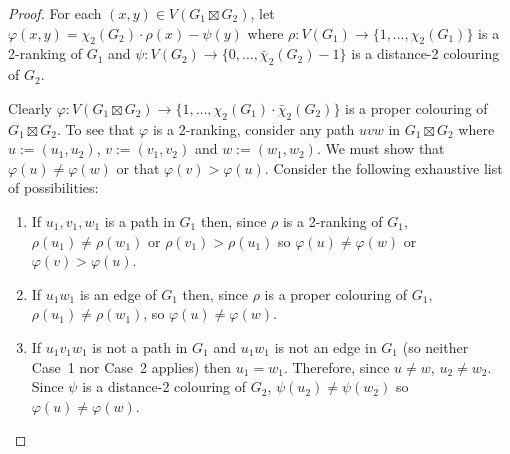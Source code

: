 \documentclass[kpfonts]{patmorin}
\newcommand{\trn}{\chi_2}
\newcommand{\dtcn}{\bar{\chi}_2}
\theoremstyle{named}
\begin{document}
\begin{proof}
    For each $(x,y)\in V(G_1\boxtimes G_2)$, let $\varphi(x,y)=\trn(G_2)\cdot \rho(x) - \psi(y)$ where $\rho:V(G_1)\to\{1,\ldots,\trn(G_1)\}$ is a 2-ranking of $G_1$ and $\psi:V(G_2)\to\{0,\ldots,\dtcn(G_2)-1\}$ is a distance-2 colouring of $G_2$.

    Clearly $\varphi:V(G_1\boxtimes G_2)\to \{1,\ldots,\trn(G_1)\cdot\dtcn(G_2)\}$ is a proper colouring of $G_1\boxtimes G_2$.  To see that $\varphi$ is a 2-ranking, consider any path $uvw$ in $G_1\boxtimes G_2$ where $u:=(u_1,u_2)$, $v:=(v_1,v_2)$ and $w:=(w_1,w_2)$.  We must show that $\varphi(u)\neq\varphi(w)$ or that $\varphi(v)>\varphi(u)$.  Consider the following exhaustive list of possibilities:
    \begin{enumerate}
        \item If $u_1,v_1,w_1$ is a path in $G_1$ then, since $\rho$ is a 2-ranking of $G_1$, $\rho(u_1)\neq\rho(w_1)$ or $\rho(v_1)>\rho(u_1)$ so $\varphi(u)\neq \varphi(w)$ or $\varphi(v)>\varphi(u)$.

        \item If $u_1w_1$ is an edge of $G_1$ then, since $\rho$ is a proper colouring of $G_1$, $\rho(u_1)\neq\rho(w_1)$, so $\varphi(u)\neq\varphi(w)$.

        \item If $u_1v_1w_1$ is not a path in $G_1$ and $u_1w_1$ is not an edge in $G_1$ (so neither Case~1 nor Case~2 applies) then $u_1=w_1$.  Therefore, since $u\neq w$, $u_2\neq w_2$. Since $\psi$ is a distance-2 colouring of $G_2$, $\psi(u_2)\neq\psi(w_2)$ so $\varphi(u)\neq\varphi(w)$.
         \qedhere
    \end{enumerate}
\end{proof}

%
%
%
%
\end{document}
